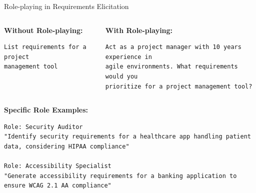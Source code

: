 \documentclass{beamer}
\begin{document}
\begin{frame}[fragile]{Role-playing in Requirements Elicitation}
    \begin{columns}[t]
        \begin{column}{0.4\textwidth}
            \textbf{Without Role-playing:}
            \begin{lstlisting}[style=code]
List requirements for a project 
management tool
  
            \end{lstlisting}
        \end{column}
        \begin{column}{0.6\textwidth}
            \textbf{With Role-playing:}
            \begin{lstlisting}[style=code]
Act as a project manager with 10 years experience in 
agile environments. What requirements would you 
prioritize for a project management tool?
            \end{lstlisting}
        \end{column}
    \end{columns}
    
    \vspace{0.5cm}
    \textbf{Specific Role Examples:}
    
    \begin{lstlisting}[style=code]
Role: Security Auditor
"Identify security requirements for a healthcare app handling patient data, considering HIPAA compliance"

Role: Accessibility Specialist  
"Generate accessibility requirements for a banking application to ensure WCAG 2.1 AA compliance"
    \end{lstlisting}
\end{frame}
\end{document}
